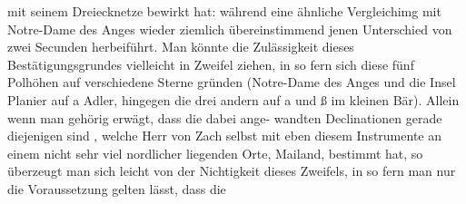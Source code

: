 \documentclass[12pt,a4paper]{article}
\begin{document}
mit seinem Dreiecknetze bewirkt hat: während eine ähnliche Vergleichimg mit Notre-Dame des Anges\newline
wieder ziemlich übereinstimmend jenen Unterschied von zwei Secunden herbeiführt. Man könnte die\newline
Zulässigkeit dieses Bestätigungsgrundes vielleicht in Zweifel ziehen, in so fern sich diese fünf Polhöhen\newline
auf verschiedene Sterne gründen (Notre-Dame des Anges und die Insel Planier auf a Adler, hingegen\newline
die drei andern auf a und ß im kleinen Bär). Allein wenn man gehörig erwägt, dass die dabei ange-\newline
wandten Declinationen gerade diejenigen sind , welche Herr von Zach selbst mit eben diesem Instrumente\newline
an einem nicht sehr viel nordlicher liegenden Orte, Mailand, bestimmt hat, so überzeugt man sich\newline
leicht von der Nichtigkeit dieses Zweifels, in so fern man nur die Voraussetzung gelten lässt, dass die\newline
\end{document}
